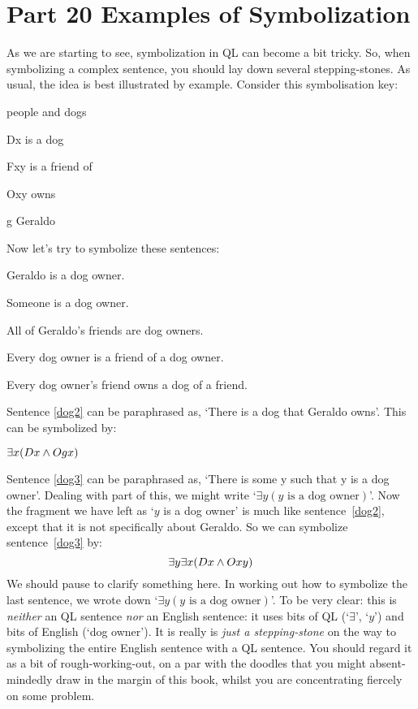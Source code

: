 \chapter{Part 20 Examples of Symbolization}
As we are starting to see, symbolization in QL can become a bit tricky. So, when symbolizing a complex sentence, you should lay down several stepping-stones. As usual, the idea is best illustrated by example. Consider this symbolisation key: 
\begin{ekey}
\item[\text{domain}] people and dogs
\item[Dx]  is a dog
\item[Fxy]  is a friend of 
\item[Oxy]  owns 
\item[g] Geraldo
\end{ekey}
Now let's try to symbolize these sentences:
\begin{earg}
\item[\ex{dog2}] Geraldo is a dog owner.
\item[\ex{dog3}] Someone is a dog owner.
\item[\ex{dog4}] All of Geraldo's friends are dog owners.
\item[\ex{dog5}] Every dog owner is a friend of a dog owner.
\item[\ex{dog6}] Every dog owner's friend owns a dog of a friend.
\end{earg}
Sentence \ref{dog2} can be paraphrased as, `There is a dog that Geraldo owns'. This can be symbolized by: 
\begin{center}
$\exists x(Dx \wedge Ogx)$
\end{center}
Sentence \ref{dog3} can be paraphrased as, `There is some y such that y is a dog owner'. Dealing with part of this, we might write `$\exists y(y\text{ is a dog owner})$'. Now the fragment we have left as `$y$ is a dog owner' is much like sentence~\ref{dog2}, except that it is not specifically about Geraldo. So we can symbolize sentence~\ref{dog3} by:
$$\exists y \exists x(Dx \wedge Oxy)$$
We should pause to clarify something here. In working out how to symbolize the last sentence, we wrote down `$\exists y(y\text{ is a dog owner})$'. To be very clear: this is \emph{neither} an QL sentence \emph{nor} an English sentence: it uses bits of QL (`$\exists$', `$y$') and bits of English (`dog owner'). It is really is \emph{just a stepping-stone} on the way to symbolizing the entire English sentence with a QL sentence. You should regard it as a bit of rough-working-out, on a par with the doodles that you might absent-mindedly draw in the margin of this book, whilst you are concentrating fiercely on some problem.  

